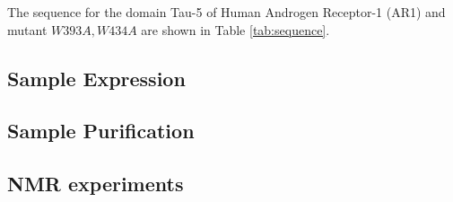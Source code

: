 The sequence for the domain Tau-5 of Human Androgen Receptor-1 (AR1) and mutant $W393A,W434A$ are shown in Table \ref{tab:sequence}. 



\subsection{Sample Expression}



\subsection{Sample Purification}


\subsection{NMR experiments}
